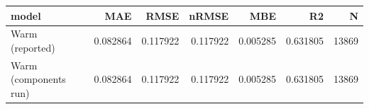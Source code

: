 \begin{tabular}{lrrrrrr}
\toprule
model & MAE & RMSE & nRMSE & MBE & R2 & N \\
\midrule
Warm (reported) & 0.082864 & 0.117922 & 0.117922 & 0.005285 & 0.631805 & 13869 \\
Warm (components run) & 0.082864 & 0.117922 & 0.117922 & 0.005285 & 0.631805 & 13869 \\
\bottomrule
\end{tabular}

